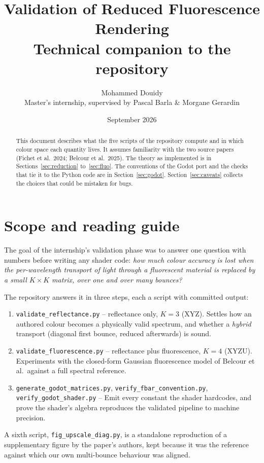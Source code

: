 \documentclass[11pt,a4paper]{article}
\title{Validation of Reduced Fluorescence Rendering\\
       \large Technical companion to the \file{spectral-reduction-validation} repository}
\author{Mohammed Douidy\\ \small Master's internship, supervised by Pascal Barla \& Morgane Gerardin}
\date{September 2026}
\newcommand{\file}[1]{\texttt{#1}}
\begin{document}
\maketitle

\begin{abstract}
\noindent
This document describes what the five scripts of the repository compute and in
which colour space each quantity lives.  It assumes familiarity with the two
source papers (Fichet et al.\ 2024; Belcour et al.\ 2025).  The theory as
implemented is in Sections~\ref{sec:reduction} to~\ref{sec:fluo}.  The
conventions of the Godot port and the checks that tie it to the Python code are
in Section~\ref{sec:godot}.  Section~\ref{sec:caveats} collects the choices
that could be mistaken for bugs.
\end{abstract}

\tableofcontents

\section{Scope and reading guide}
\label{sec:scope}

The goal of the internship's validation phase was to answer one question with
numbers before writing any shader code: \emph{how much colour accuracy is lost
when the per-wavelength transport of light through a fluorescent material is
replaced by a small $K\times K$ matrix, over one and over many bounces?}

The repository answers it in three steps, each a script with committed output:
\begin{enumerate}[nosep]
  \item \file{validate\_reflectance.py} -- reflectance only, $K=3$ (XYZ).  Settles
        how an authored colour becomes a physically valid spectrum, and whether a
        \emph{hybrid} transport (diagonal first bounce, reduced afterwards) is sound.
  \item \file{validate\_fluorescence.py} -- reflectance plus fluorescence, $K=4$
        (XYZU).  Experiments with the closed-form Gaussian fluorescence
        model of Belcour et al.\ against a full spectral reference.
  \item \file{generate\_godot\_matrices.py}, \file{verify\_fbar\_convention.py},
        \file{verify\_godot\_shader.py} -- Emit every
        constant the shader hardcodes, and prove the shader's algebra reproduces the
        validated pipeline to machine precision.
\end{enumerate}
A sixth script, \file{fig\_upscale\_diag.py}, is a standalone reproduction of a
supplementary figure by the paper's authors, kept because it was the reference
against which our own multi-bounce behaviour was aligned.
\end{document}
